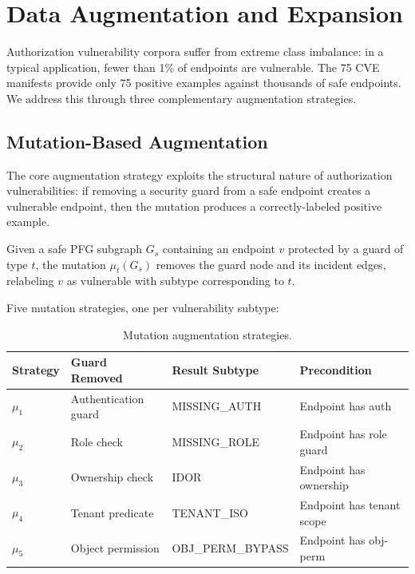 \section{Data Augmentation and Expansion}
\label{sec:augmentation}

Authorization vulnerability corpora suffer from extreme class imbalance: in a typical application, fewer than 1\% of endpoints are vulnerable. The 75 CVE manifests provide only 75 positive examples against thousands of safe endpoints. We address this through three complementary augmentation strategies.

\subsection{Mutation-Based Augmentation}

The core augmentation strategy exploits the structural nature of authorization vulnerabilities: if removing a security guard from a safe endpoint creates a vulnerable endpoint, then the mutation produces a correctly-labeled positive example.

\begin{definition}
Given a safe PFG subgraph $G_s$ containing an endpoint $v$ protected by a guard of type $t$, the mutation $\mu_t(G_s)$ removes the guard node and its incident edges, relabeling $v$ as vulnerable with subtype corresponding to $t$.
\end{definition}

Five mutation strategies, one per vulnerability subtype:

\begin{table}[htbp]
\centering
\caption{Mutation augmentation strategies.}
\label{tab:mutations}
\small
\begin{tabular}{@{}llll@{}}
\toprule
\textbf{Strategy} & \textbf{Guard Removed} & \textbf{Result Subtype} & \textbf{Precondition} \\
\midrule
$\mu_1$ & Authentication guard & MISSING\_AUTH & Endpoint has auth \\
$\mu_2$ & Role check & MISSING\_ROLE & Endpoint has role guard \\
$\mu_3$ & Ownership check & IDOR & Endpoint has ownership \\
$\mu_4$ & Tenant predicate & TENANT\_ISO & Endpoint has tenant scope \\
$\mu_5$ & Object permission & OBJ\_PERM\_BYPASS & Endpoint has obj-perm \\
\bottomrule
\end{tabular}
\end{table}

